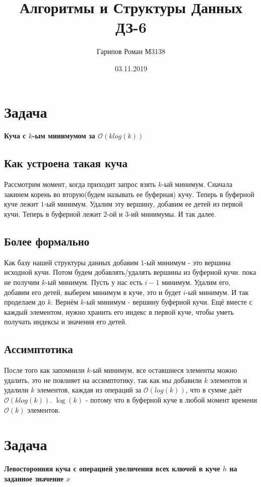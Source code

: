 \documentclass{article}
\title{Алгоритмы и Структуры Данных ДЗ-6}
\date{03.11.2019}
\author{Гарипов Роман М3138}
\begin{document}
  \maketitle
  \newpage

\section*{Задача }
\textbf{Куча с $k$-ым минимумом за $\mathcal{O}(klog(k))$}
\subsection*{Как устроена такая куча}
Рассмотрим момент, когда приходит запрос взять $k$-ый минимум. Сначала закинем корень во вторую(будем называть ее буферная) кучу. Теперь в буферной куче лежит $1$-ый минимум. Удалим эту вершину, добавим ее детей из первой кучи. Теперь в буферной лежит $2$-ой и $3$-ий минимумы. И так далее. 
\subsection*{Более формально}
Как базу нашей структуры данных добавим $1$-ый минимум - это вершина исходной кучи. Потом будем добавлять/удалять вершины из буферной кучи. пока не получим $k$-ый минимум. Пусть у нас есть $i - 1$ минимум. Удалим его, добавим его детей, выберем минимум в куче, это и будет $i$-ый минимум. И так проделаем до $k$. Вернём $k$-ый минимум - вершину буферной кучи.
\newline
Ещё вместе с каждый элементом, нужно хранить его индекс в первой куче, чтобы уметь получать индексы и значения его детей.
\subsection*{Ассимптотика}
После того как запомнили $k$-ый минимум, все оставшиеся элементы можно удалить, это не повлияет на ассимптотику, так как мы добавили $k$ элементов и удалили $k$ элементов, каждая из операций за $\mathcal{O}(log(k))$, что в сумме даёт $\mathcal{O}(klog(k))$. 
\newline
$\log(k)$ - потому что в буферной куче в любой момент времени $\mathcal{O}(k)$ элементов.
\section*{Задача }
\textbf{Левосторонняя куча с операцией увеличения всех ключей в куче $h$ на заданное значение $x$}
\end{document}
